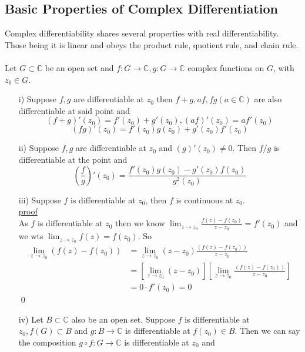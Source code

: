 \documentclass[a4paper, 12pt, twoside]{article}
\begin{document}
            \subsection{Basic Properties of Complex Differentiation}
                Complex differentiability shares several properties with real differentiability. Those being it is linear and obeys the product rule, quotient rule, and chain rule.\\\\
                Let $G\subset \mathbb{C}$ be an open set and $f:G \to  \mathbb{C}, g:G \to  \mathbb{C}$ complex functions on $G$, with $z_{0}\in G$.
                \begin{itemize}
                    \item[i)]  Suppose $f,g$ are differentiable at $z_{0}$ then  $f+g,af,fg (a\in \mathbb{C})$ are also differentiable at said point and
                    \noindent
                    $$(f+g)'(z_{0})=f'(z_{0})+g'(z_{0}), (af)'(z_{0})=af'(z_{0}) $$
                    $$(fg)'(z_{0})= f'(z_{0})g(z_{0})+g'(z_{0})f'(z_{0}) $$
                    \item[ii)]  Suppose $f,g$ are differentiable at $z_{0}$ and $(g)'(z_{0})\neq 0$. Then $f/g$ is differentiable at the point and
                    $$(\frac{f}{g})'(z_{0})=\frac{f'(z_{0})g(z_{0})-g'(z_{0})f(z_{0})}{g^{2}(z_{0})} $$
                    \item[iii)] Suppose $f$ is differentiable at $z_{0}$, then $f$ is continuous at $z_{0}$.\\
                    \underline{proof}\\
                    As $f$ is differentiable at $z_{0}$ then we know $\lim_{z\to z_{0}}\frac{f(z)-f(z_{0})}{z-z_{0}}=f'(z_{0}) $ and we wts $ \lim_{z\to z_{0}}f(z)=f(z_{0})$. So
                    \begin{align*}
                         \lim_{z\to z_{0}}(f(z)-f(z_{0})) &=  \lim_{z\to z_{0}}(z-z_{0})\frac{(f(z)-f(z_{0}))}{z-z_{0}}\\
                         &=[\lim_{z\to z_{0}}(z-z_{0})][\lim_{z\to z_{0}}\frac{(f(z)-f(z_{0}))}{z-z_{0}}]\\
                         &= 0\cdot f'(z_{0}) =0
                    \end{align*}\qed\newpage
                    \item[iv)] Let $B\subset \mathbb{C}$ also be an open set. Suppose $f$ is differentiable at $z_{0},f(G)\subset B$ and $g:B\to \mathbb{C}$ is differentiable at $f(z_{0})\in B$. Then we can say the composition $g\circ f:G\to \mathbb{C}$ is differentiable at $z_{0}$ and

\end{itemize}
\end{document}

